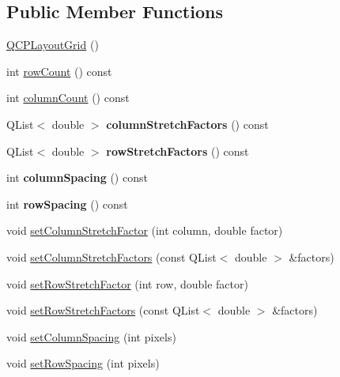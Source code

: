 \subsection*{Public Member Functions}
\begin{DoxyCompactItemize}
\item 
\hyperlink{class_q_c_p_layout_grid_ab2a4c1587dc8aed4c41c509c8d8d2a64}{Q\+C\+P\+Layout\+Grid} ()
\item 
int \hyperlink{class_q_c_p_layout_grid_a19c66fd76cbce58a8e94f33797e0c0aa}{row\+Count} () const
\item 
int \hyperlink{class_q_c_p_layout_grid_a1a2962cbf45011405b64b913afa8e7a2}{column\+Count} () const
\item 
\hypertarget{class_q_c_p_layout_grid_a8e0e587c386bbcd1b94119f5f44c512d}{}\label{class_q_c_p_layout_grid_a8e0e587c386bbcd1b94119f5f44c512d} 
Q\+List$<$ double $>$ {\bfseries column\+Stretch\+Factors} () const
\item 
\hypertarget{class_q_c_p_layout_grid_aa33408586427e77e05f79defde7f3568}{}\label{class_q_c_p_layout_grid_aa33408586427e77e05f79defde7f3568} 
Q\+List$<$ double $>$ {\bfseries row\+Stretch\+Factors} () const
\item 
\hypertarget{class_q_c_p_layout_grid_adcf4c387d5996bf6e4ae0ed26138247e}{}\label{class_q_c_p_layout_grid_adcf4c387d5996bf6e4ae0ed26138247e} 
int {\bfseries column\+Spacing} () const
\item 
\hypertarget{class_q_c_p_layout_grid_a4cb6c680505cd0ce6f85b9e217fd2cd0}{}\label{class_q_c_p_layout_grid_a4cb6c680505cd0ce6f85b9e217fd2cd0} 
int {\bfseries row\+Spacing} () const
\item 
void \hyperlink{class_q_c_p_layout_grid_ae38f31a71687b9d7ee3104852528fb50}{set\+Column\+Stretch\+Factor} (int column, double factor)
\item 
void \hyperlink{class_q_c_p_layout_grid_a6c2591d1a7e2534ce036989543b49e57}{set\+Column\+Stretch\+Factors} (const Q\+List$<$ double $>$ \&factors)
\item 
void \hyperlink{class_q_c_p_layout_grid_a7b0273de5369bd93d942edbaf5b166ec}{set\+Row\+Stretch\+Factor} (int row, double factor)
\item 
void \hyperlink{class_q_c_p_layout_grid_a200b45f9c908f96ebadaa3c8d87a2782}{set\+Row\+Stretch\+Factors} (const Q\+List$<$ double $>$ \&factors)
\item 
void \hyperlink{class_q_c_p_layout_grid_a3a49272aba32bb0fddc3bb2a45a3dba0}{set\+Column\+Spacing} (int pixels)
\item 
void \hyperlink{class_q_c_p_layout_grid_aaef2cd2d456197ee06a208793678e436}{set\+Row\+Spacing} (int pixels)

\end{DoxyCompactItemize}
